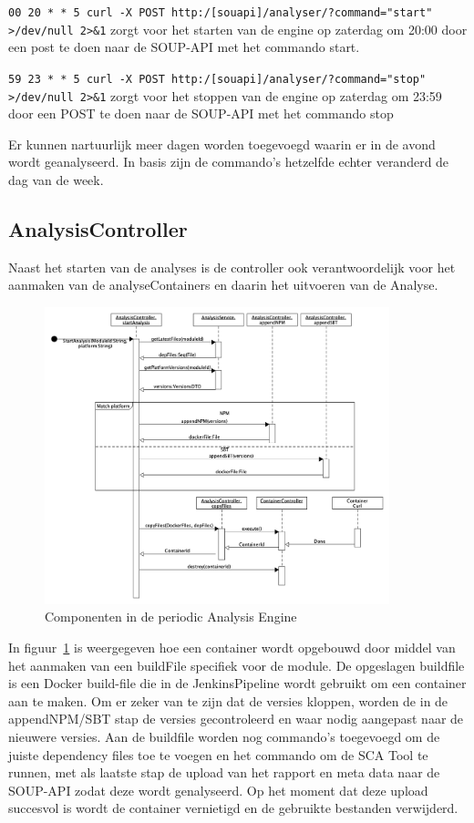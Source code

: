 \texttt{00 20 * * 5 curl -X POST http:/[souapi]/analyser/?command="start" >/dev/null 2>\&1} zorgt voor het starten van de engine op zaterdag om 20:00 door een post te doen naar de SOUP-API met het commando start.

\texttt{59 23 * * 5 curl -X POST http:/[souapi]/analyser/?command="stop" >/dev/null 2>\&1} zorgt voor het stoppen van de engine op zaterdag om 23:59 door een POST te doen naar de SOUP-API met het commando stop

Er kunnen nartuurlijk meer dagen worden toegevoegd waarin er in de avond wordt geanalyseerd. In basis zijn de commando's hetzelfde echter veranderd de dag van de week.

\subsection{AnalysisController}\label{subsec:analysiscontroller}
Naast het starten van de analyses is de controller ook verantwoordelijk voor het aanmaken van de analyseContainers en daarin het uitvoeren van de Analyse.
\begin{figure}[bth]
    \myfloatalign
    \includegraphics[width=10cm]{gfx/umlet/exports/PAE-CreateContainer}
    \caption{Componenten in de periodic Analysis Engine}
    \label{fig:paeSeq}
\end{figure}
In figuur~\ref{fig:paeSeq} is weergegeven hoe een container wordt opgebouwd door middel van het aanmaken van een buildFile specifiek voor de module. De opgeslagen buildfile is een Docker build-file die in de JenkinsPipeline wordt gebruikt om een container aan te maken. Om er zeker van te zijn dat de versies kloppen, worden de in de appendNPM/SBT stap de versies gecontroleerd en waar nodig aangepast naar de nieuwere versies. Aan de buildfile worden nog commando's toegevoegd om de juiste dependency files toe te voegen en het commando om de SCA Tool te runnen, met als laatste stap de upload van het rapport en meta data naar de SOUP-API zodat deze wordt genalyseerd. Op het moment dat deze upload succesvol is wordt de container vernietigd en de gebruikte bestanden verwijderd.
%

